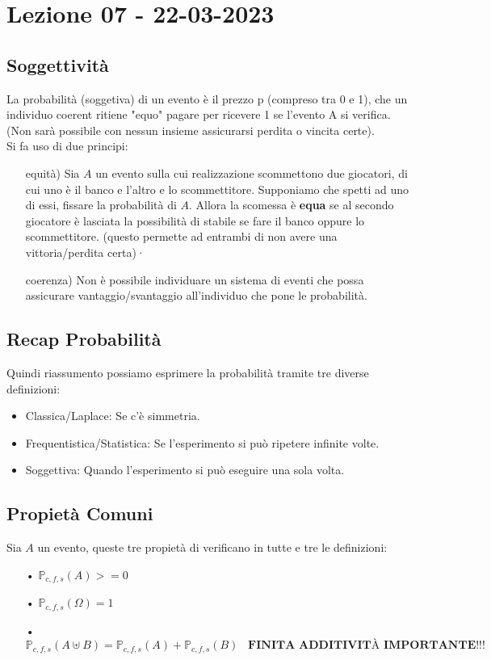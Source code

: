 \section{Lezione 07 - 22-03-2023}

\subsection{Soggettività}
La probabilità (soggetiva) di un evento è il prezzo p (compreso tra 0 e 1), che un individuo coerent ritiene "equo" pagare per ricevere 1 se l'evento A si verifica.\\
(Non sarà possibile con nessun insieme assicurarsi perdita o vincita certe).\\
Si fa uso di due principi:
\begin{itemize}
\item[equità)] Sia $A$ un evento sulla cui realizzazione scommettono due giocatori, di cui uno è il banco e l'altro e lo scommettitore. Supponiamo che spetti ad uno di essi, fissare la probabilità di $A$. Allora la scomessa è \textbf{equa} se al secondo giocatore è lasciata la possibilità di stabile se fare il banco oppure lo scommettitore.
(questo permette ad entrambi di non avere una vittoria/perdita certa)·
\item[coerenza)] Non è possibile individuare un sistema di
eventi che possa assicurare vantaggio/svantaggio all’individuo che pone
le probabilità.
\end{itemize}

\subsection{Recap Probabilità}
Quindi riassumento possiamo esprimere la probabilità tramite tre diverse definizioni:
\begin{itemize}
\item Classica/Laplace: Se c'è simmetria.
\item Frequentistica/Statistica: Se l'esperimento si può ripetere infinite volte.
\item Soggettiva: Quando l'esperimento si può eseguire una sola volta.
\end{itemize}

\subsection{Propietà Comuni}
Sia $A$ un evento, queste tre propietà di verificano in tutte e tre le definizioni:
\begin{itemize}
\item[•] $ \mathbb{P}_{c,f,s}(A) >= 0 $
\item[•] $ \mathbb{P}_{c,f,s}(\Omega) = 1 $
\item[•] $ \mathbb{P}_{c,f,s}(A \uplus B) = \mathbb{P}_{c,f,s}(A) + \mathbb{P}_{c,f,s}(B) \;\;\; \textbf{FINITA ADDITIVITÀ IMPORTANTE!!!} $ 
\end{itemize}

